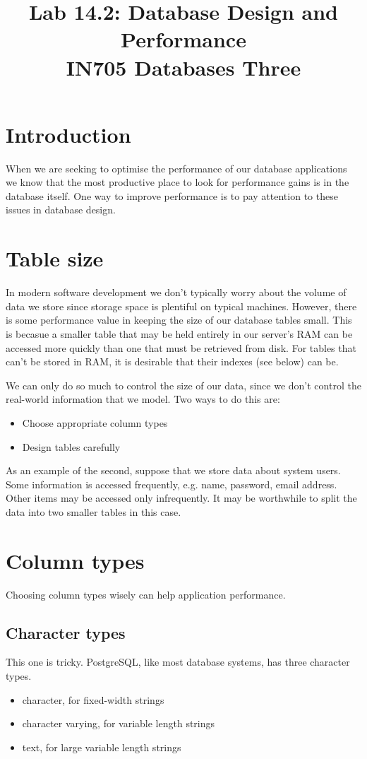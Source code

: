 \documentclass{article}
\begin{document}
\title{Lab 14.2: Database Design and Performance\\ IN705 Databases Three}
\date{}
\maketitle

\section*{Introduction}
When we are seeking to optimise the performance of our database applications
we know that the most productive place to look for performance gains is in the database 
itself.  One way to improve performance is to pay attention to these issues in database design.

\section{Table size}
In modern software development we don't typically worry about the volume of data
we store since storage space is plentiful on typical machines.  However, there is
some performance value in keeping the size of our database tables small.  This is 
becasue a smaller table that may be held entirely in our server's RAM can be 
accessed more quickly than one that must be retrieved from disk.  For tables
that can't be stored in RAM, it is desirable that their indexes (see below) can be.

We can only do so much to control the size of our data, since we don't control the
real-world information that we model.  Two ways to do this are:

\begin{itemize}
	\item Choose appropriate column types
	\item Design tables carefully
\end{itemize}

As an example of the second, suppose that we store data about system users.  Some
information is accessed frequently, e.g. name, password, email address.  Other
items may be accessed only infrequently.  It may be worthwhile to split the data into two
smaller tables in this case.

\section{Column types}
Choosing column types wisely can help application performance.

\subsection{Character types}
This one is tricky.  PostgreSQL, like most database systems, has three
character types.

\begin{itemize}
	\item character, for fixed-width strings
	\item character varying, for variable length strings
	\item text, for large variable length strings
\end{itemize}
\end{document}
